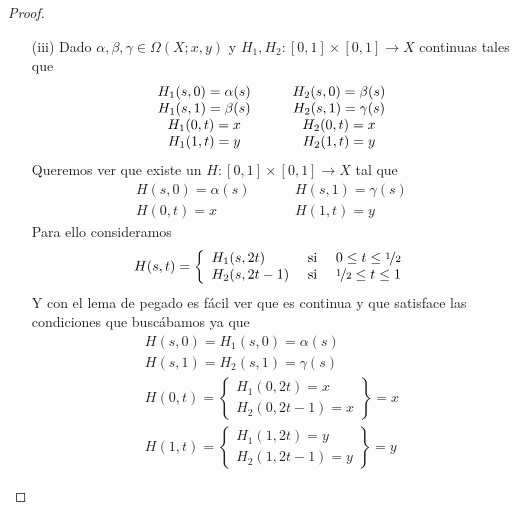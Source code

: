 \begin{lema}
\begin{proof}
\begin{enumerate}
            \item[(iii)] Dado $\alpha, \beta, \gamma\in \Omega(X;x,y)$ y $H_1,H_2:[0,1]\times[0,1]\to X$ continuas tales que 
            \begin{gather*}
                \begin{array}{c c c c}
                    H_1(s,0) = \alpha(s) &&& H_2(s,0) = \beta(s)\\
                    H_1(s,1) = \beta(s) &&& H_2(s,1) = \gamma(s)\\
                    H_1(0,t) = x &&& H_2(0,t) = x\\
                    H_1(1, t) = y &&& H_2(1,t) = y
                \end{array}
            \end{gather*}
            Queremos ver que existe un $H:[0,1]\times [0,1]\to X$ tal que 
            \begin{align*}
                H(s,0) = \alpha(s) \hspace{1cm} & H(s,1) = \gamma(s)\\
                H(0,t) = x \hspace{1cm} & H(1,t) = y
            \end{align*}
            Para ello consideramos 
            \begin{gather*}
                H(s,t) = \left\{
                    \begin{array}{l c c}
                        H_1(s,2t) & \text{ si } & 0 \leq t \leq \nicefrac{1}{2}\\
                        H_2(s, 2t-1) & \text{ si } & \nicefrac{1}{2} \leq t \leq 1
                    \end{array}
                \right.
            \end{gather*}
            Y con el lema de pegado es fácil ver que es continua y que satisface las condiciones que buscábamos ya que 
            \begin{gather*}
                H(s,0)=H_1(s,0) = \alpha(s)\\
                H(s,1)=H_2(s,1) = \gamma(s)\\
                H(0,t) = \left\{
                \begin{array}{l}
                    H_1(0,2t) = x\\
                    H_2(0,2t-1) = x
                \end{array}
                \right\} = x\\
                H(1,t) = \left\{
                \begin{array}{l}
                    H_1(1,2t) = y\\
                    H_2(1,2t-1) = y
                \end{array}
                \right\} = y
            \end{gather*}
        \end{enumerate}
    \end{proof}
\end{lema}

